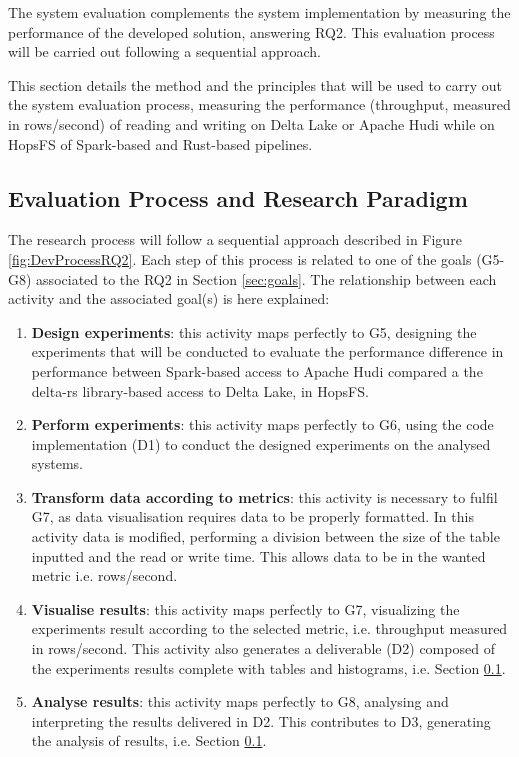 The system evaluation complements the system implementation by measuring the performance of the developed solution, answering RQ2. This evaluation process will be carried out following a sequential approach.

This section details the method and the principles that will be used to carry out the system evaluation process, measuring the performance (throughput, measured in rows/second) of reading and writing on Delta Lake or Apache Hudi while on \gls{HopsFS} of Spark-based and Rust-based pipelines. 

\subsection{Evaluation Process and Research Paradigm}
The research process will follow a sequential approach described in Figure \ref{fig:DevProcessRQ2}. Each step of this process is related to one of the goals (G5-G8) associated to the RQ2 in Section \ref{sec:goals}.
The relationship between each activity and the associated goal(s) is here explained:
\begin{enumerate}
    \item \textbf{Design experiments}: this activity maps perfectly to G5, designing the experiments that will be conducted to evaluate the performance difference in performance between Spark-based access to Apache Hudi compared a the delta-rs \cite{DeltaioDeltars2024} library-based access to Delta Lake, in \gls{HopsFS}. 
    \item \textbf{Perform experiments}: this activity maps perfectly to G6, using the code implementation (D1) to conduct the designed experiments on the analysed systems.
    \item \textbf{Transform data according to metrics}: this activity is necessary to fulfil G7, as data visualisation requires data to be properly formatted. In this activity data is modified, performing a division between the size of the table inputted and the read or write time. This allows data to be in the wanted metric i.e. rows/second.
    \item \textbf{Visualise results}: this activity maps perfectly to G7, visualizing the experiments result according to the selected metric, i.e. throughput measured in rows/second. This activity also generates a deliverable (D2) composed of the experiments results complete with tables and histograms, i.e. Section \ref{}.
    \item \textbf{Analyse results}: this activity maps perfectly to G8, analysing and interpreting the results delivered in D2. This contributes to D3, generating the analysis of results, i.e. Section \ref{}.
\end{enumerate}
